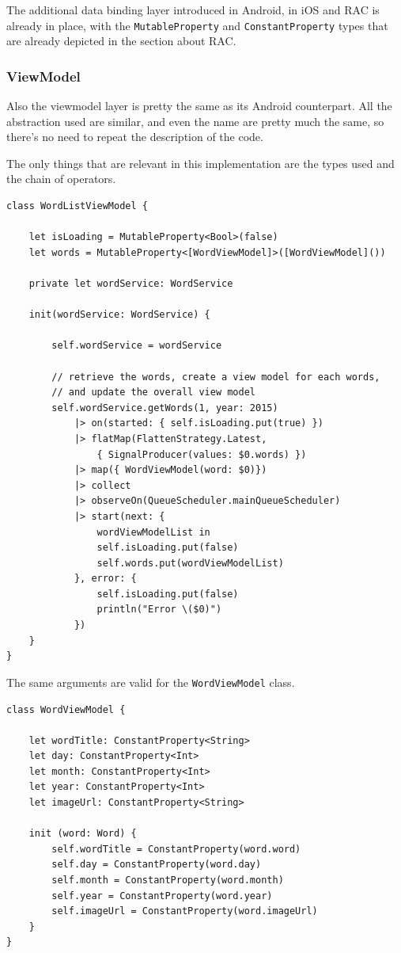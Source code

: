 The additional data binding layer introduced in Android, in iOS and RAC
is already in place, with the \texttt{MutableProperty} and
\texttt{ConstantProperty} types that are already depicted in the section
about RAC.

\subsubsection{ViewModel}\label{viewmodel}

Also the viewmodel layer is pretty the same as its Android counterpart.
All the abstraction used are similar, and even the name are pretty much
the same, so there's no need to repeat the description of the code.

The only things that are relevant in this implementation are the types
used and the chain of operators.

\begin{verbatim}
class WordListViewModel {

    let isLoading = MutableProperty<Bool>(false)
    let words = MutableProperty<[WordViewModel]>([WordViewModel]())

    private let wordService: WordService

    init(wordService: WordService) {

        self.wordService = wordService

        // retrieve the words, create a view model for each words,
        // and update the overall view model
        self.wordService.getWords(1, year: 2015)
            |> on(started: { self.isLoading.put(true) })
            |> flatMap(FlattenStrategy.Latest,
                { SignalProducer(values: $0.words) })
            |> map({ WordViewModel(word: $0)})
            |> collect
            |> observeOn(QueueScheduler.mainQueueScheduler)
            |> start(next: {
                wordViewModelList in
                self.isLoading.put(false)
                self.words.put(wordViewModelList)
            }, error: {
                self.isLoading.put(false)
                println("Error \($0)")
            })
    }
}
\end{verbatim}

The same arguments are valid for the \texttt{WordViewModel} class.

\begin{verbatim}
class WordViewModel {

    let wordTitle: ConstantProperty<String>
    let day: ConstantProperty<Int>
    let month: ConstantProperty<Int>
    let year: ConstantProperty<Int>
    let imageUrl: ConstantProperty<String>

    init (word: Word) {
        self.wordTitle = ConstantProperty(word.word)
        self.day = ConstantProperty(word.day)
        self.month = ConstantProperty(word.month)
        self.year = ConstantProperty(word.year)
        self.imageUrl = ConstantProperty(word.imageUrl)
    }
}
\end{verbatim}


